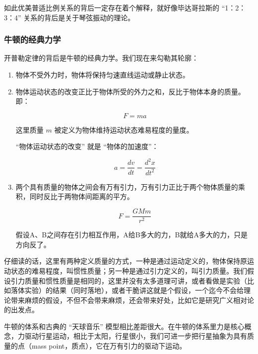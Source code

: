如此优美普适比例关系的背后一定存在着个解释，就好像毕达哥拉斯的 “1：2：3：4” 关系的背后是关于琴弦振动的理论。

\subsubsection{牛顿的经典力学}

开普勒定律的背后是牛顿的经典力学。我们现在来勾勒其轮廓：

\begin{enumerate}
\item 

物体不受外力时，物体将保持匀速直线运动或静止状态。

\item

物体运动状态的改变正比于物体所受的外力之和，反比于物体本身的质量。即：

\begin{equation}
F = ma
\end{equation}

这里质量 $m$ 被定义为物体维持运动状态难易程度的量度。

“物体运动状态的改变” 就是 “物体的加速度”：

\begin{equation}
a = \frac{d v}{d t} = \frac{d^2 x}{d t^2}
\end{equation}

\item

两个具有质量的物体之间会有万有引力，万有引力正比于两个物体质量的乘积，同时反比于两物体间距离的平方。

\begin{equation}
F = \frac{G M m}{r^2}
\end{equation}

假设A、B之间存在引力相互作用，A给B多大的力，B就给A多大的力，只是方向反了。

\end{enumerate}

仔细读的话，这里有两种定义质量的方式，一种是通过运动定义的，物体保持原运动状态的难易程度，叫惯性质量；另一种是通过引力定义的，叫引力质量。我们假设引力质量和惯性质量是相同的，这里并没有太多道理可讲，或者看做是实验（比如落体实验）的结果（同时落地），或者干脆讲这就是个假设，一个迄今不会给理论带来麻烦的假设，不但不会带来麻烦，还会带来好处，比如它是研究广义相对论的出发点。

牛顿的体系和古典的 “天球音乐” 模型相比差距很大。在牛顿的体系里力是核心概念，力驱动行星运动，相比于太阳，行星很小，我们可进一步把行星抽象为具有质量的点（mass point，质点），它在万有引力的驱动下运动。

